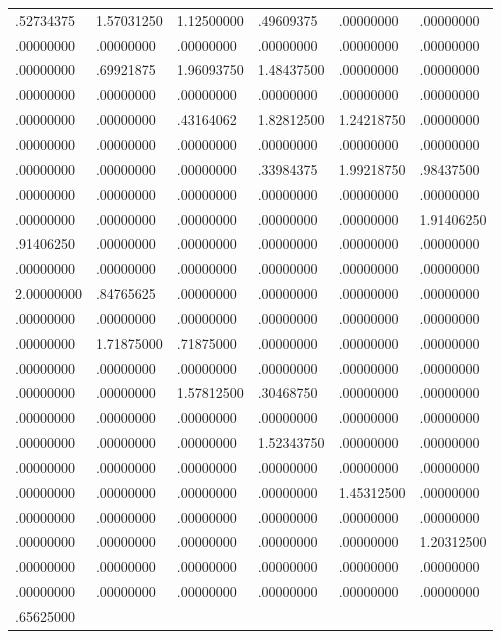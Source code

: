 \documentclass[11pt]{article}
\theoremstyle{definition}
\theoremstyle{remark}
\begin{document}
\begin{longtable}{llllll}
.52734375 & 1.57031250 & 1.12500000 & .49609375 & .00000000 & .00000000 \\
.00000000 & .00000000 & .00000000 & .00000000 & .00000000 & .00000000 \\
.00000000 & .69921875 & 1.96093750 & 1.48437500 & .00000000 & .00000000 \\
.00000000 & .00000000 & .00000000 & .00000000 & .00000000 & .00000000 \\
.00000000 & .00000000 & .43164062 & 1.82812500 & 1.24218750 & .00000000 \\
.00000000 & .00000000 & .00000000 & .00000000 & .00000000 & .00000000 \\
.00000000 & .00000000 & .00000000 & .33984375 & 1.99218750 & .98437500 \\
.00000000 & .00000000 & .00000000 & .00000000 & .00000000 & .00000000 \\
.00000000 & .00000000 & .00000000 & .00000000 & .00000000 & 1.91406250 \\
.91406250 & .00000000 & .00000000 & .00000000 & .00000000 & .00000000 \\
.00000000 & .00000000 & .00000000 & .00000000 & .00000000 & .00000000 \\
2.00000000 & .84765625 & .00000000 & .00000000 & .00000000 & .00000000 \\
.00000000 & .00000000 & .00000000 & .00000000 & .00000000 & .00000000 \\
.00000000 & 1.71875000 & .71875000 & .00000000 & .00000000 & .00000000 \\
.00000000 & .00000000 & .00000000 & .00000000 & .00000000 & .00000000 \\
.00000000 & .00000000 & 1.57812500 & .30468750 & .00000000 & .00000000 \\
.00000000 & .00000000 & .00000000 & .00000000 & .00000000 & .00000000 \\
.00000000 & .00000000 & .00000000 & 1.52343750 & .00000000 & .00000000 \\
.00000000 & .00000000 & .00000000 & .00000000 & .00000000 & .00000000 \\
.00000000 & .00000000 & .00000000 & .00000000 & 1.45312500 & .00000000 \\
.00000000 & .00000000 & .00000000 & .00000000 & .00000000 & .00000000 \\
.00000000 & .00000000 & .00000000 & .00000000 & .00000000 & 1.20312500 \\
.00000000 & .00000000 & .00000000 & .00000000 & .00000000 & .00000000 \\
.00000000 & .00000000 & .00000000 & .00000000 & .00000000 & .00000000 \\
.65625000 &  &  &  &  &  \\
\end{longtable}
\end{document}
